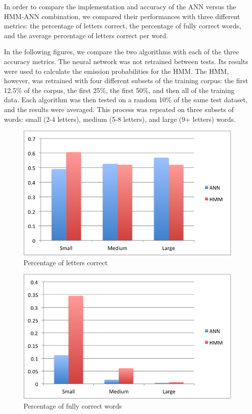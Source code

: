 \documentclass[11pt,a4paper,twocolumn]{article}
\begin{document}
In order to compare the implementation and accuracy of the ANN versus the
HMM-ANN combination, we compared their performances with three different
metrics: the percentage of letters correct, the
percentage of fully correct words, and the average percentage of letters correct per word.

In the following figures, we compare the two algorithms with each of the three accuracy metrics. The
neural network was not retrained between tests. Its results were used to calculate the emission
probabilities for the HMM\@. The HMM, however, was retrained with four different subsets of the
training corpus: the first 12.5\% of the corpus, the first 25\%, the first 50\%, and then all of the
training data. Each algorithm was then tested on a random 10\% of the same test dataset, and the
results were averaged. This process was repeated on three subsets of words: small (2-4 letters),
medium (5-8 letters), and large (9+ letters) words.

\begin{figure}[h]
\centering
\caption{Percentage of letters correct}
\includegraphics[scale=0.55]{img/lettersCorrect.png}
\end{figure}

\begin{figure}[h]
\centering
\caption{Percentage of fully correct words}
\includegraphics[scale=0.55]{img/wordsCorrect.png}
\end{figure}
\end{document}
